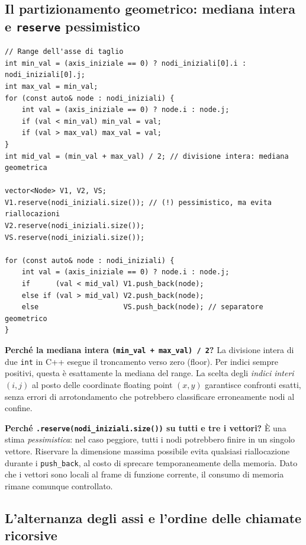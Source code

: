\documentclass[a4paper,11pt]{article}
\theoremstyle{definition}
\begin{document}
\subsection{Il partizionamento geometrico: mediana intera e \texttt{reserve} pessimistico}

\begin{lstlisting}[style=cpp, caption={Calcolo della mediana e suddivisione in V1, VS, V2}]
// Range dell'asse di taglio
int min_val = (axis_iniziale == 0) ? nodi_iniziali[0].i : nodi_iniziali[0].j;
int max_val = min_val;
for (const auto& node : nodi_iniziali) {
    int val = (axis_iniziale == 0) ? node.i : node.j;
    if (val < min_val) min_val = val;
    if (val > max_val) max_val = val;
}
int mid_val = (min_val + max_val) / 2; // divisione intera: mediana geometrica

vector<Node> V1, V2, VS;
V1.reserve(nodi_iniziali.size()); // (!) pessimistico, ma evita riallocazioni
V2.reserve(nodi_iniziali.size());
VS.reserve(nodi_iniziali.size());

for (const auto& node : nodi_iniziali) {
    int val = (axis_iniziale == 0) ? node.i : node.j;
    if      (val < mid_val) V1.push_back(node);
    else if (val > mid_val) V2.push_back(node);
    else                    VS.push_back(node); // separatore geometrico
}
\end{lstlisting}

\textbf{Perché la mediana intera \texttt{(min\_val + max\_val) / 2}?} La divisione intera di due \texttt{int} in C++ esegue il troncamento verso zero (floor). Per indici sempre positivi, questa è esattamente la mediana del range. La scelta degli \emph{indici interi} $(i,j)$ al posto delle coordinate floating point $(x,y)$ garantisce confronti esatti, senza errori di arrotondamento che potrebbero classificare erroneamente nodi al confine.

\textbf{Perché \texttt{.reserve(nodi\_iniziali.size())} su tutti e tre i vettori?} È una stima \emph{pessimistica}: nel caso peggiore, tutti i nodi potrebbero finire in un singolo vettore. Riservare la dimensione massima possibile evita qualsiasi riallocazione durante i \texttt{push\_back}, al costo di sprecare temporaneamente della memoria. Dato che i vettori sono locali al frame di funzione corrente, il consumo di memoria rimane comunque controllato.

\subsection{L'alternanza degli assi e l'ordine delle chiamate ricorsive}
\end{document}
